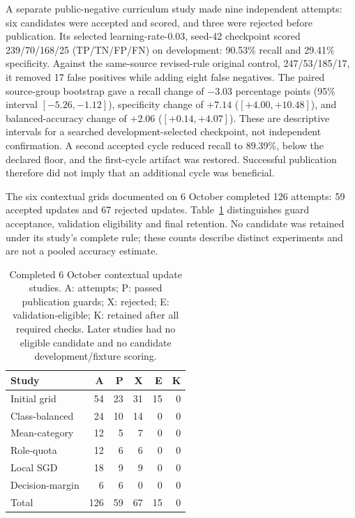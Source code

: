 \documentclass[conference]{IEEEtran}
\begin{document}
A separate public-negative curriculum study made nine independent attempts: six candidates were accepted and scored, and three were rejected before publication. Its selected learning-rate-0.03, seed-42 checkpoint scored 239/70/168/25 (TP/TN/FP/FN) on development: 90.53\% recall and 29.41\% specificity. Against the same-source revised-rule original control, 247/53/185/17, it removed 17 false positives while adding eight false negatives. The paired source-group bootstrap gave a recall change of $-3.03$ percentage points (95\% interval $[-5.26,-1.12]$), specificity change of $+7.14$ ($[+4.00,+10.48]$), and balanced-accuracy change of $+2.06$ ($[+0.14,+4.07]$). These are descriptive intervals for a searched development-selected checkpoint, not independent confirmation. A second accepted cycle reduced recall to 89.39\%, below the declared floor, and the first-cycle artifact was restored. Successful publication therefore did not imply that an additional cycle was beneficial.

The six contextual grids documented on 6 October completed 126 attempts: 59 accepted updates and 67 rejected updates. Table~\ref{tab:contextual_updates} distinguishes guard acceptance, validation eligibility and final retention. No candidate was retained under its study's complete rule; these counts describe distinct experiments and are not a pooled accuracy estimate.

\begin{table}[t]
\centering
\caption{Completed 6 October contextual update studies. A: attempts; P: passed publication guards; X: rejected; E: validation-eligible; K: retained after all required checks. Later studies had no eligible candidate and no candidate development/fixture scoring.}
\label{tab:contextual_updates}
\small
\setlength{\tabcolsep}{3pt}
\begin{tabular}{lrrrrr}
\hline
Study & A & P & X & E & K \\
\hline
Initial grid & 54 & 23 & 31 & 15 & 0 \\
Class-balanced & 24 & 10 & 14 & 0 & 0 \\
Mean-category & 12 & 5 & 7 & 0 & 0 \\
Role-quota & 12 & 6 & 6 & 0 & 0 \\
Local SGD & 18 & 9 & 9 & 0 & 0 \\
Decision-margin & 6 & 6 & 0 & 0 & 0 \\
\hline
Total & 126 & 59 & 67 & 15 & 0 \\
\hline
\end{tabular}
\end{table}
\end{document}

